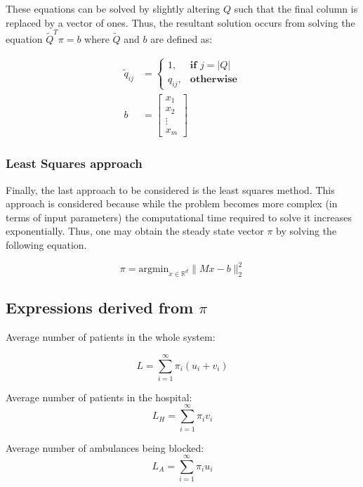 \documentclass{article}
\begin{document}
These equations can be solved by slightly altering $Q$ such that the final column is replaced by a vector of ones. Thus, the resultant solution occurs from solving the equation $\tilde{Q}^T \pi = b$ where $\tilde{Q}$ and $b$ are defined as:

\begin{align}
    \tilde{q}_{i j} &= 
    \begin{cases}
        1, & \textbf{if } j = |Q| \\
        q_{i j}, & \textbf{otherwise}
    \end{cases} \\
    b &= 
    \begin{bmatrix}
        x_{1} \\
        x_{2} \\
        \vdots \\
        x_{m}
    \end{bmatrix}
\end{align}


\subsubsection{Least Squares approach}
Finally, the last approach to be considered is the least squares method. This approach is considered because while the problem becomes more complex (in terms of input parameters) the computational time required to solve it increases exponentially. Thus, one may obtain the steady state vector $\pi$ by solving the following equation.

\begin{equation}
\pi = \text{argmin}_{x\in\mathbb{R}^{d}}\|Mx-b\|_2^2
\end{equation}


\newpage
\subsection{Expressions derived from $\pi$}
Average number of patients in the whole system: 

\begin{equation}
L = \sum_{i=1}^{\infty} \pi_i (u_i + v_i)
\end{equation} 

Average number of patients in the hospital: 
\begin{equation}
L_H = \sum_{i=1}^{\infty} \pi_i v_i
\end{equation} 

Average number of ambulances being blocked:
\begin{equation}
L_A = \sum_{i=1}^{\infty} \pi_i u_i
\end{equation}
\end{document}
